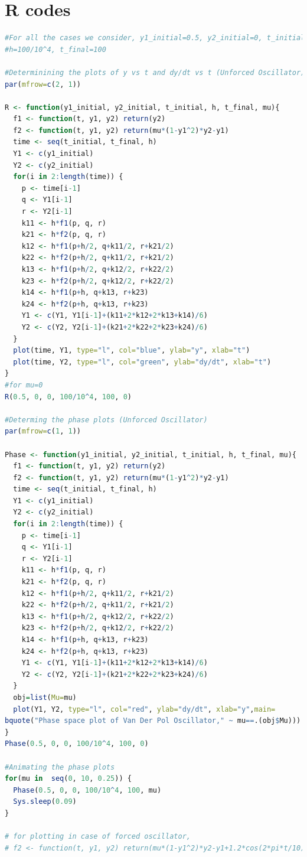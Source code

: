 \documentclass{article}
\begin{document}
\section{R codes}
\begin{lstlisting}[frame=single, language=R]
#For all the cases we consider, y1_initial=0.5, y2_initial=0, t_initial=0, 
#h=100/10^4, t_final=100

#Determinining the plots of y vs t and dy/dt vs t (Unforced Oscillator)
par(mfrow=c(2, 1))

R <- function(y1_initial, y2_initial, t_initial, h, t_final, mu){
  f1 <- function(t, y1, y2) return(y2)
  f2 <- function(t, y1, y2) return(mu*(1-y1^2)*y2-y1)
  time <- seq(t_initial, t_final, h)
  Y1 <- c(y1_initial)
  Y2 <- c(y2_initial)
  for(i in 2:length(time)) {
    p <- time[i-1]
    q <- Y1[i-1]
    r <- Y2[i-1]
    k11 <- h*f1(p, q, r)
    k21 <- h*f2(p, q, r)
    k12 <- h*f1(p+h/2, q+k11/2, r+k21/2) 
    k22 <- h*f2(p+h/2, q+k11/2, r+k21/2) 
    k13 <- h*f1(p+h/2, q+k12/2, r+k22/2)
    k23 <- h*f2(p+h/2, q+k12/2, r+k22/2)
    k14 <- h*f1(p+h, q+k13, r+k23)
    k24 <- h*f2(p+h, q+k13, r+k23)
    Y1 <- c(Y1, Y1[i-1]+(k11+2*k12+2*k13+k14)/6)
    Y2 <- c(Y2, Y2[i-1]+(k21+2*k22+2*k23+k24)/6)
  }
  plot(time, Y1, type="l", col="blue", ylab="y", xlab="t")
  plot(time, Y2, type="l", col="green", ylab="dy/dt", xlab="t")
}
#for mu=0
R(0.5, 0, 0, 100/10^4, 100, 0)  

#Determing the phase plots (Unforced Oscillator)
par(mfrow=c(1, 1))

Phase <- function(y1_initial, y2_initial, t_initial, h, t_final, mu){
  f1 <- function(t, y1, y2) return(y2)
  f2 <- function(t, y1, y2) return(mu*(1-y1^2)*y2-y1)
  time <- seq(t_initial, t_final, h)
  Y1 <- c(y1_initial)
  Y2 <- c(y2_initial)
  for(i in 2:length(time)) {
    p <- time[i-1]
    q <- Y1[i-1]
    r <- Y2[i-1]
    k11 <- h*f1(p, q, r)
    k21 <- h*f2(p, q, r)
    k12 <- h*f1(p+h/2, q+k11/2, r+k21/2) 
    k22 <- h*f2(p+h/2, q+k11/2, r+k21/2) 
    k13 <- h*f1(p+h/2, q+k12/2, r+k22/2)
    k23 <- h*f2(p+h/2, q+k12/2, r+k22/2)
    k14 <- h*f1(p+h, q+k13, r+k23)
    k24 <- h*f2(p+h, q+k13, r+k23)
    Y1 <- c(Y1, Y1[i-1]+(k11+2*k12+2*k13+k14)/6)
    Y2 <- c(Y2, Y2[i-1]+(k21+2*k22+2*k23+k24)/6)
  }
  obj=list(Mu=mu)
  plot(Y1, Y2, type="l", col="red", ylab="dy/dt", xlab="y",main=
bquote("Phase space plot of Van Der Pol Oscillator," ~ mu==.(obj$Mu)))
}
Phase(0.5, 0, 0, 100/10^4, 100, 0)

#Animating the phase plots
for(mu in  seq(0, 10, 0.25)) {
  Phase(0.5, 0, 0, 100/10^4, 100, mu)
  Sys.sleep(0.09)
}

# for plotting in case of forced oscillator, 
# f2 <- function(t, y1, y2) return(mu*(1-y1^2)*y2-y1+1.2*cos(2*pi*t/10))
\end{lstlisting}
\end{document}
